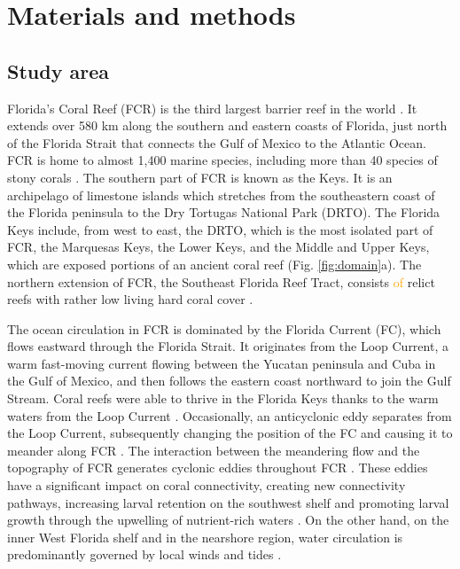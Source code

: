 \documentclass[fleqn,10pt]{wlscirep}
\newcommand{\modif}[1]{\textcolor{orange}{#1}}
\begin{document}
\section{Materials and methods}
\subsection{Study area}
Florida's Coral Reef (FCR) is the third largest barrier reef in the world \citep{Finkl2008Jul}. It extends over 580 km along the southern and eastern coasts of Florida, just north of the Florida Strait that connects the Gulf of Mexico to the Atlantic Ocean. FCR is home to almost 1,400 marine species, including more than 40 species of stony corals \citep{Banks2008}. The southern part of FCR is known as the Keys. It is an archipelago of limestone islands which stretches from the southeastern coast of the Florida peninsula to the Dry Tortugas National Park (DRTO). The Florida Keys include, from west to east, the DRTO, which is the most isolated part of FCR, the Marquesas Keys, the Lower Keys, and the Middle and Upper Keys, which are exposed portions of an ancient coral reef (Fig. \ref{fig:domain}a). The northern extension of FCR, the Southeast Florida Reef Tract, consists \modif{of} relict reefs with rather low living hard coral cover \citep{Hoffmeister1968Nov,Banks2008}.

The ocean circulation in FCR is dominated by the Florida Current (FC), which flows eastward through the Florida Strait. It originates from the Loop Current, a warm fast-moving current flowing between the Yucatan peninsula and Cuba in the Gulf of Mexico, and then follows the eastern coast northward to join the Gulf Stream. Coral reefs were able to thrive in the Florida Keys thanks to the warm waters from the Loop Current \citep{Donahue2008Jan}. Occasionally, an anticyclonic eddy separates from the Loop Current, subsequently changing the position of the FC and causing it to meander along FCR \citep{Leipper1970Jan,Vukovich1988Dec}. The interaction between the meandering flow and the topography of FCR generates cyclonic eddies throughout FCR \citep{Kourafalou2012May}. These eddies have a significant impact on coral connectivity, creating new connectivity pathways, increasing larval retention on the southwest shelf and promoting larval growth through the upwelling of nutrient-rich waters \citep{Limouzy-Paris1997Jul,Lee1994May, Burgess2007Jul}. On the other hand, on the inner West Florida shelf and  in the nearshore region, water circulation is predominantly governed by local winds and tides \citep{Lee2002Jun,Sponaugle2007Feb}.
\end{document}
